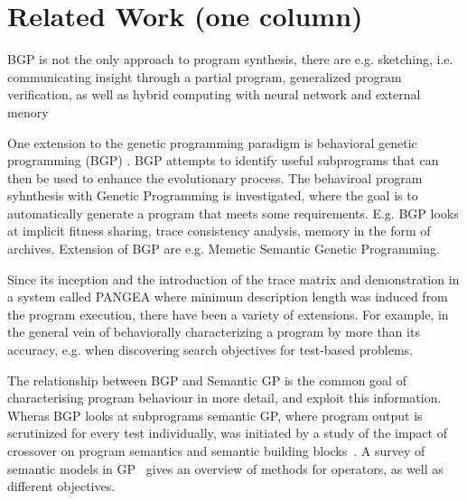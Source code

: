 \section{Related Work (one column)}
\label{sec:related-work}

BGP is not the only approach to program synthesis, there are e.g. sketching\cite{solar2008program}, i.e. communicating insight through a partial program, generalized program verification\cite{srivastava2010program}, as well as hybrid computing with neural network and external menory\cite{graves2016hybrid}

One extension to the genetic programming paradigm is behavioral
genetic programming (BGP) \cite{krawiecGecco2014,KrawiecBPS2016}.  BGP
attempts to identify useful subprograms that can then be used to
enhance the evolutionary process. The behaviroal program syhnthesis
with Genetic Programming\cite{krawiec2016behavioral} is investigated,
where the goal is to automatically generate a program that meets some
requirements. E.g. BGP looks at implicit fitness
sharing\cite{mckay2000fitness}, trace consistency analysis, memory in
the form of archives\cite{haynes1997line}. Extension of BGP are
e.g. Memetic Semantic Genetic
Programming\cite{Ffrancon:2015:MSG:2739480.2754697}.

Since its inception\cite{krawiec2013pattern} and the introduction of
the trace matrix and demonstration in a system called PANGEA where
minimum description length was induced from the program execution,
there have been a variety of extensions. For example, in the general
vein of behaviorally characterizing a program by more than its
accuracy, e.g. when discovering search objectives for test-based
problems\cite{liskowski2016online}.

The relationship between BGP and Semantic GP is the common goal of
characterising program behaviour in more detail, and exploit this
information. Wheras BGP looks at subprograms semantic GP, where
program output is scrutinized for every test individually, was
initiated by a study of the impact of crossover on program semantics
and semantic building blocks~\cite{mcphee2008semantic}. A survey of
semantic models in GP~\cite{vanneschi2014survey} gives an overview of
methods for operators, as well as different objectives.

